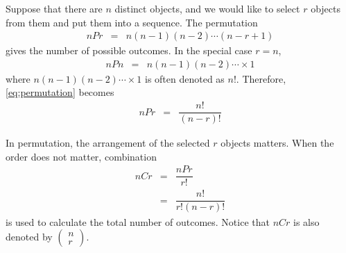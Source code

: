 Suppose that there are $n$ distinct objects, and we would like to select $r$ objects from them and put them into a sequence. The permutation
\begin{eqnarray}
  nPr &=& n(n-1)(n-2)\cdots (n-r+1) \label{eq:permutation}
\end{eqnarray}
gives the number of possible outcomes. In the special case $r=n$,
\begin{eqnarray}
  nPn &=& n(n-1)(n-2)\cdots \times 1 \nonumber
\end{eqnarray}
where $n(n-1)(n-2)\cdots \times 1$ is often denoted as $n!$. Therefore, \eqref{eq:permutation} becomes
\begin{eqnarray}
  nPr &=& \dfrac{n!}{(n-r)!} \nonumber
\end{eqnarray}

In permutation, the arrangement of the selected $r$ objects matters. When the order does not matter, combination
\begin{eqnarray}
  nCr &=& \dfrac{nPr}{r!} \nonumber \\
  &=& \dfrac{n!}{r!(n-r)!} \nonumber
\end{eqnarray}
is used to calculate the total number of outcomes. Notice that $nCr$ is also denoted by $\left(\begin{array}{c}
                                                                                           n \\
                                                                                           r
                                                                                         \end{array}\right)$.
